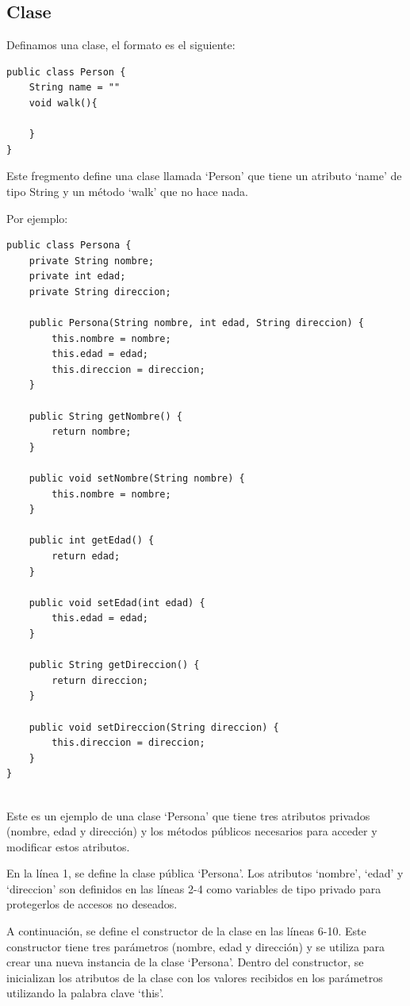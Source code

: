 \documentclass[executivepaper]{article}
\begin{document}
\subsection{Clase}
Definamos una clase, el formato es el siguiente:
\begin{lstlisting}
public class Person {
    String name = ""
    void walk(){

    }
}
\end{lstlisting}
Este fregmento define una clase llamada \enquote*{Person} que tiene un atributo \enquote*{name} de tipo String y un método \enquote*{walk} que no hace nada.

Por ejemplo:
\begin{lstlisting}
public class Persona {
    private String nombre;
    private int edad;
    private String direccion;

    public Persona(String nombre, int edad, String direccion) {
        this.nombre = nombre;
        this.edad = edad;
        this.direccion = direccion;
    }

    public String getNombre() {
        return nombre;
    }

    public void setNombre(String nombre) {
        this.nombre = nombre;
    }

    public int getEdad() {
        return edad;
    }

    public void setEdad(int edad) {
        this.edad = edad;
    }

    public String getDireccion() {
        return direccion;
    }

    public void setDireccion(String direccion) {
        this.direccion = direccion;
    }
}
    
\end{lstlisting}
Este es un ejemplo de una clase \enquote*{Persona} que tiene tres atributos privados (nombre, edad y dirección) y los métodos públicos necesarios para acceder y modificar estos atributos.

En la línea 1, se define la clase pública \enquote*{Persona}. Los atributos \enquote*{nombre}, \enquote*{edad} y \enquote*{direccion} son definidos en las líneas 2-4 como variables de tipo privado para protegerlos de accesos no deseados.

A continuación, se define el constructor de la clase en las líneas 6-10. Este constructor tiene tres parámetros (nombre, edad y dirección) y se utiliza para crear una nueva instancia de la clase \enquote*{Persona}. Dentro del constructor, se inicializan los atributos de la clase con los valores recibidos en los parámetros utilizando la palabra clave \enquote*{this}.
\end{document}
